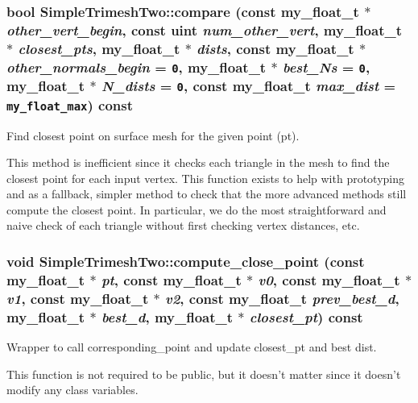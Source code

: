 \subsubsection{\setlength{\rightskip}{0pt plus 5cm}bool Simple\-Trimesh\-Two::compare (const my\_\-float\_\-t $\ast$ {\em other\_\-vert\_\-begin}, const uint {\em num\_\-other\_\-vert}, my\_\-float\_\-t $\ast$ {\em closest\_\-pts}, my\_\-float\_\-t $\ast$ {\em dists}, const my\_\-float\_\-t $\ast$ {\em other\_\-normals\_\-begin} = {\tt 0}, my\_\-float\_\-t $\ast$ {\em best\_\-Ns} = {\tt 0}, my\_\-float\_\-t $\ast$ {\em N\_\-dists} = {\tt 0}, const my\_\-float\_\-t {\em max\_\-dist} = {\tt my\_\-float\_\-max}) const\hspace{0.3cm}{\tt  [virtual]}}\label{classSimSite3D_1_1geometry_1_1SimpleTrimeshTwo_6a394127681e1e61e8ce2e14e6a6d8ae}


Find closest point on surface mesh for the given point (pt). 

This method is inefficient since it checks each triangle in the mesh to find the closest point for each input vertex. This function exists to help with prototyping and as a fallback, simpler method to check that the more advanced methods still compute the closest point. In particular, we do the most straightforward and naive check of each triangle without first checking vertex distances, etc. 
\subsubsection{\setlength{\rightskip}{0pt plus 5cm}void Simple\-Trimesh\-Two::compute\_\-close\_\-point (const my\_\-float\_\-t $\ast$ {\em pt}, const my\_\-float\_\-t $\ast$ {\em v0}, const my\_\-float\_\-t $\ast$ {\em v1}, const my\_\-float\_\-t $\ast$ {\em v2}, const my\_\-float\_\-t {\em prev\_\-best\_\-d}, my\_\-float\_\-t $\ast$ {\em best\_\-d}, my\_\-float\_\-t $\ast$ {\em closest\_\-pt}) const}\label{classSimSite3D_1_1geometry_1_1SimpleTrimeshTwo_acb3a26966405908d642026fe52e2395}


Wrapper to call corresponding\_\-point and update closest\_\-pt and best dist. 

This function is not required to be public, but it doesn't matter since it doesn't modify any class variables. 
